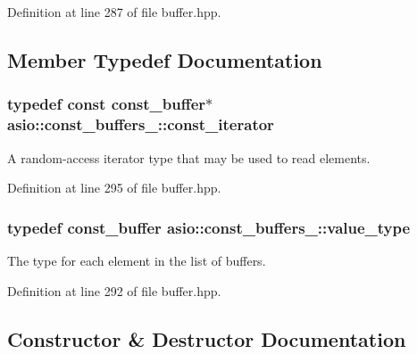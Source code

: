 Definition at line 287 of file buffer.\+hpp.



\subsection{Member Typedef Documentation}
\hypertarget{classasio_1_1const__buffers__1_af82877a0ca877a65af2e4c0990c854b4}{}
\subsubsection[{const\+\_\+iterator}]{\setlength{\rightskip}{0pt plus 5cm}typedef const {\bf const\+\_\+buffer}$\ast$ {\bf asio\+::const\+\_\+buffers\+\_\+::const\+\_\+iterator}}\label{classasio_1_1const__buffers__1_af82877a0ca877a65af2e4c0990c854b4}


A random-\/access iterator type that may be used to read elements. 



Definition at line 295 of file buffer.\+hpp.

\hypertarget{classasio_1_1const__buffers__1_a6ff152a78d4d0e448b3b98e26dc22fc2}{}
\subsubsection[{value\+\_\+type}]{\setlength{\rightskip}{0pt plus 5cm}typedef {\bf const\+\_\+buffer} {\bf asio\+::const\+\_\+buffers\+\_\+::value\+\_\+type}}\label{classasio_1_1const__buffers__1_a6ff152a78d4d0e448b3b98e26dc22fc2}


The type for each element in the list of buffers. 



Definition at line 292 of file buffer.\+hpp.



\subsection{Constructor \& Destructor Documentation}
\hypertarget{classasio_1_1const__buffers__1_a87113aa988e30be0a4e8a384400bf1aa}{}
